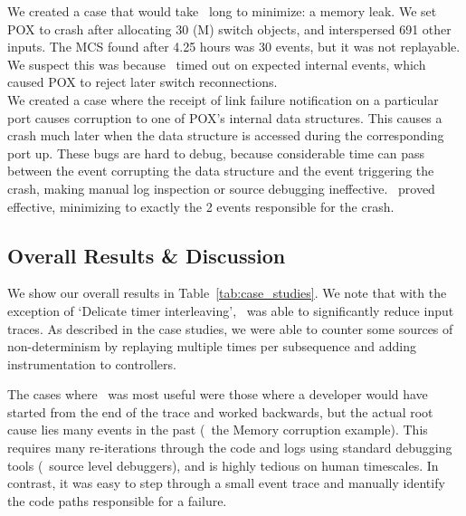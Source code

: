 %
We created a case that would take \projectname~long to minimize: a
memory leak. We set POX to
crash after allocating 30 (M) switch objects, and interspersed 691
other inputs. The MCS found after 4.25 hours was 30 events, but it
was not replayable. We suspect this was because \projectname~timed out on
expected internal events, which caused POX to reject later switch
reconnections.\\[0.5ex]
%
We created a case where the receipt of
link failure notification on a particular port causes corruption to one of
POX's internal data
structures. This causes a crash much later when the data structure is
accessed during the corresponding port up. These bugs
are hard to debug, because considerable time can pass between the event
corrupting the data structure and the event triggering the crash, making
manual log inspection or source debugging ineffective.
\projectname~proved effective, minimizing to
exactly the 2 events responsible for the crash.

\subsection{Overall Results \& Discussion}

We show our overall results in
Table~\ref{tab:case_studies}. We note that with the exception of `Delicate timer
interleaving', \projectname~was able to significantly reduce input traces.
As described in the case studies, we were able to
counter some sources of non-determinism
by replaying multiple times per subsequence and adding instrumentation to
controllers.


The cases where \projectname~was most useful were those where a developer would
have started from
the end of the trace and worked backwards, but
the actual root cause lies many events in the past (\eg~the Memory corruption
example). This requires many re-iterations through the code and logs using standard
debugging tools (\eg~source level debuggers), and
is highly tedious on human timescales. In contrast, it was easy to step
through a small event trace and manually identify the code paths responsible
for a failure.

